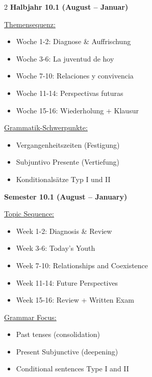 \documentclass[10pt,a4paper]{article}
\newcommand{\bil}[2]{%
\begin{paracol}{2}
\small #1
\switchcolumn
\small\textcolor{english}{#2}
\end{paracol}
}
\begin{document}
\bil{%
\textbf{Halbjahr 10.1 (August -- Januar)}

\underline{Themensequenz:}
\begin{itemize}[noitemsep,topsep=2pt]
\item Woche 1-2: Diagnose \& Auffrischung
\item Woche 3-6: La juventud de hoy
\item Woche 7-10: Relaciones y convivencia
\item Woche 11-14: Perspectivas futuras
\item Woche 15-16: Wiederholung + Klausur
\end{itemize}

\underline{Grammatik-Schwerpunkte:}
\begin{itemize}[noitemsep,topsep=2pt]
\item Vergangenheitszeiten (Festigung)
\item Subjuntivo Presente (Vertiefung)
\item Konditionalsätze Typ I und II
\end{itemize}
}{%
\textbf{Semester 10.1 (August -- January)}

\underline{Topic Sequence:}
\begin{itemize}[noitemsep,topsep=2pt]
\item Week 1-2: Diagnosis \& Review
\item Week 3-6: Today's Youth
\item Week 7-10: Relationships and Coexistence
\item Week 11-14: Future Perspectives
\item Week 15-16: Review + Written Exam
\end{itemize}

\underline{Grammar Focus:}
\begin{itemize}[noitemsep,topsep=2pt]
\item Past tenses (consolidation)
\item Present Subjunctive (deepening)
\item Conditional sentences Type I and II
\end{itemize}
}

\vspace{2mm}
\end{document}
